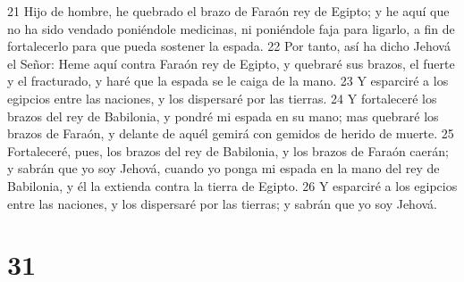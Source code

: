 21 Hijo de hombre, he quebrado el brazo de Faraón rey de Egipto; y he aquí que no ha sido vendado poniéndole medicinas, ni poniéndole faja para ligarlo, a fin de fortalecerlo para que pueda sostener la espada.
22 Por tanto, así ha dicho Jehová el Señor: Heme aquí contra Faraón rey de Egipto, y quebraré sus brazos, el fuerte y el fracturado, y haré que la espada se le caiga de la mano.
23 Y esparciré a los egipcios entre las naciones, y los dispersaré por las tierras.
24 Y fortaleceré los brazos del rey de Babilonia, y pondré mi espada en su mano; mas quebraré los brazos de Faraón, y delante de aquél gemirá con gemidos de herido de muerte.
25 Fortaleceré, pues, los brazos del rey de Babilonia, y los brazos de Faraón caerán; y sabrán que yo soy Jehová, cuando yo ponga mi espada en la mano del rey de Babilonia, y él la extienda contra la tierra de Egipto.
26 Y esparciré a los egipcios entre las naciones, y los dispersaré por las tierras; y sabrán que yo soy Jehová.

\chapter{31}

